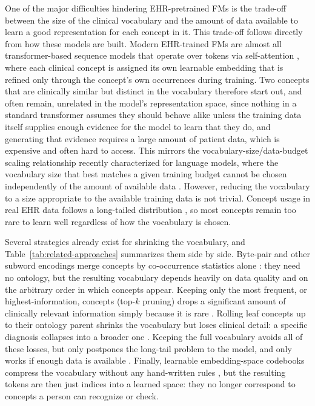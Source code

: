 One of the major difficulties hindering EHR-pretrained FMs is the trade-off between the size of the clinical vocabulary and the amount of data available to learn a good representation for each concept in it. This trade-off follows directly from how these models are built. Modern EHR-trained FMs are almost all transformer-based sequence models that operate over tokens via self-attention , where each clinical concept is assigned its own learnable embedding that is refined only through the concept's own occurrences during training. Two concepts that are clinically similar but distinct in the vocabulary therefore start out, and often remain, unrelated in the model's representation space, since nothing in a standard transformer assumes they should behave alike unless the training data itself supplies enough evidence for the model to learn that they do, and generating that evidence requires a large amount of patient data, which is expensive and often hard to access. This mirrors the vocabulary-size/data-budget scaling relationship recently characterized for language models, where the vocabulary size that best matches a given training budget cannot be chosen independently of the amount of available data . However, reducing the vocabulary to a size appropriate to the available training data is not trivial. Concept usage in real EHR data follows a long-tailed distribution , so most concepts remain too rare to learn well regardless of how the vocabulary is chosen.

Several strategies already exist for shrinking the vocabulary, and Table~\ref{tab:related-approaches} summarizes them side by side. Byte-pair and other subword encodings merge concepts by co-occurrence statistics alone : they need no ontology, but the resulting vocabulary depends heavily on data quality and on the arbitrary order in which concepts appear. Keeping only the most frequent, or highest-information, concepts (top-$k$ pruning) drops a significant amount of clinically relevant information simply because it is rare . Rolling leaf concepts up to their ontology parent shrinks the vocabulary but loses clinical detail: a specific diagnosis collapses into a broader one . Keeping the full vocabulary avoids all of these losses, but only postpones the long-tail problem to the model, and only works if enough data is available . Finally, learnable embedding-space codebooks compress the vocabulary without any hand-written rules , but the resulting tokens are then just indices into a learned space: they no longer correspond to concepts a person can recognize or check.

